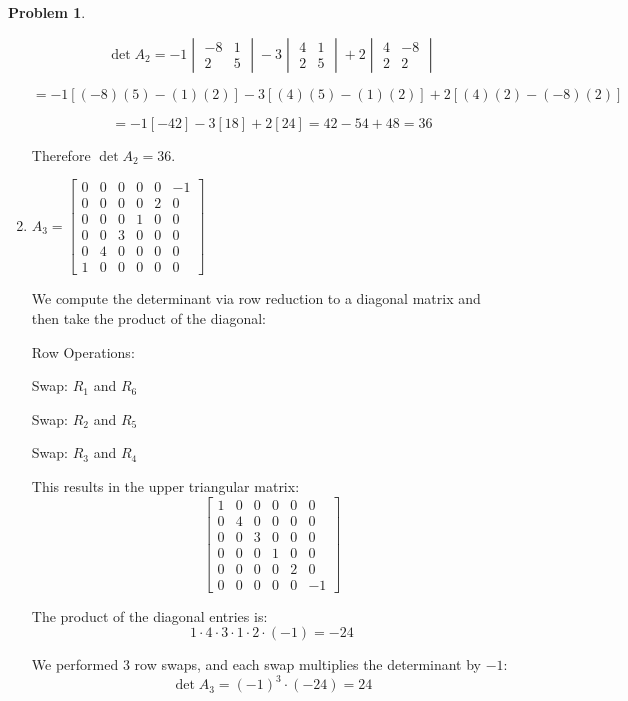 \documentclass[12pt, oneside]{amsart}
\theoremstyle{definition}
\newtheorem{prob}{Problem}
\begin{document}
\begin{prob}
\begin{enumerate}
\begin{solution}
    \[
    \det A_2 = -1 \begin{vmatrix} -8 & 1 \\ 2 & 5 \end{vmatrix} - 3 \begin{vmatrix} 4 & 1 \\ 2 & 5 \end{vmatrix} + 2 \begin{vmatrix} 4 & -8 \\ 2 & 2 \end{vmatrix}
    \]
    
    \[
    = -1[(-8)(5) - (1)(2)] - 3[(4)(5) - (1)(2)] + 2[(4)(2) - (-8)(2)]
    \]
    
    \[
    = -1[-42] - 3[18] + 2[24] = 42 - 54 + 48 = 36
    \]
    
    Therefore $\det A_2 = 36$.
    \end{solution}

    \item $A_3= \left[\begin{matrix}
        0 & 0 & 0 & 0 & 0 & -1 \\
        0 & 0 & 0 & 0 & 2 & 0 \\ 
        0 & 0 & 0 & 1 & 0 & 0 \\
        0 & 0 & 3 & 0 & 0 & 0 \\
        0 & 4 & 0 & 0 & 0 & 0 \\
        1 & 0 & 0 & 0 & 0 & 0 
    \end{matrix}\right]$
    
    \begin{solution}
    We compute the determinant via row reduction to a diagonal matrix and then take the product of the diagonal:
    
    Row Operations:
    
    Swap: $R_1$ and $R_6$

    Swap: $R_2$ and $R_5$

    Swap: $R_3$ and $R_4$

    This results in the upper triangular matrix:
    \[
    \begin{bmatrix}
    1 & 0 & 0 & 0 & 0 & 0 \\
    0 & 4 & 0 & 0 & 0 & 0 \\
    0 & 0 & 3 & 0 & 0 & 0 \\
    0 & 0 & 0 & 1 & 0 & 0 \\
    0 & 0 & 0 & 0 & 2 & 0 \\
    0 & 0 & 0 & 0 & 0 & -1
    \end{bmatrix}
    \]
    
    The product of the diagonal entries is:
    \[
    1 \cdot 4 \cdot 3 \cdot 1 \cdot 2 \cdot (-1) = -24
    \]
    
    We performed 3 row swaps, and each swap multiplies the determinant by $-1$:
    \[
    \det A_3 = (-1)^3 \cdot (-24) = 24
    \]
    \end{solution}
\end{enumerate}
\end{prob}
\end{document}
